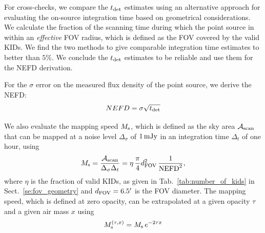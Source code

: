 For cross-checks, we compare the $t_{\rm{det}}$ estimates using an
alternative approach for evaluating the on-source integration
time based on geometrical considerations. We calculate the
fraction of the scanning time during which the point source in within
an \emph{effective} FOV radius, which is defined as the FOV covered by the
valid KIDs. We find the two methods to give comparable integration
time estimates to better than $5\%$. We conclude the $t_{\rm{det}}$
estimates to be reliable and use them for the NEFD derivation.  

For the $\sigma$ error on the measured flux density of
the point source, we derive the NEFD:
\begin{equation}
  NEFD = \sigma \sqrt{t_{\rm{det}}}
  \label{eq:nefd_det}
\end{equation}

We also evaluate the mapping speed $M_{\rm{s}}$, which is defined as the sky area
$\mathcal{A}_{\rm{scan}}$ that can be mapped at a noise level
$\Delta_\sigma$ of $1\,\rm{mJy}$ in an integration time $\Delta_t$ of
one hour, using
%
\begin{equation}
M_{\rm{s}} = \frac{\mathcal{A}_{\rm{scan}}}{\Delta_\sigma\Delta_t} = \eta \, \frac{\pi}{4} d_{\rm{FOV}}^2 \, \frac{1}{\rm{NEFD}^2},
\label{eq:mapping_speed}
\end{equation}
%
where $\eta$ is the fraction of valid KIDs, as given in
Tab.~\ref{tab:number_of_kids} in Sect.~\ref{se:fov_geometry} and
$d_{\rm{FOV}} = 6.5'$ is the FOV diameter.
The mapping speed, which is
defined at zero opacity, can be extrapolated at a given opacity $\tau$
and a given air mass $x$ using
\begin{equation}
  M_{\rm{s}}^{(\tau, x)} = M_{\rm{s}}\, e^{-2 \tau x}
  \label{eq:ms_extrapol}
\end{equation}



